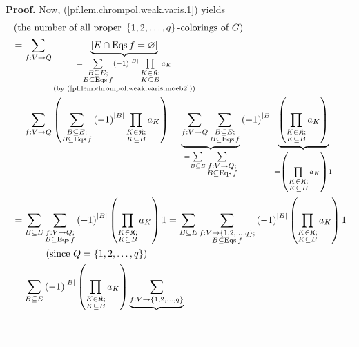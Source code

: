 \documentclass[numbers=enddot,12pt,final,onecolumn,notitlepage]{scrartcl}%
\theoremstyle{definition}
\newenvironment{proof}[1][Proof]{\noindent\textbf{#1.} }{\ \rule{0.5em}{0.5em}}
\newenvironment{verlong}{}{}
\let\sumnonlimits\sum
\let\prodnonlimits\prod
\renewcommand{\sum}{\sumnonlimits\limits}
\renewcommand{\prod}{\prodnonlimits\limits}
\begin{document}
\begin{verlong}
\begin{proof}
Now, (\ref{pf.lem.chrompol.weak.varis.1}) yields%
\begin{align*}
&  \left(  \text{the number of all proper }\left\{  1,2,\ldots,q\right\}
\text{-colorings of }G\right) \\
&  =\sum_{f:V\rightarrow Q}\underbrace{\left[  E\cap\operatorname*{Eqs}%
f=\varnothing\right]  }_{\substack{=\sum_{\substack{B\subseteq E;\\B\subseteq
\operatorname*{Eqs}f}}\left(  -1\right)  ^{\left\vert B\right\vert }%
\prod_{\substack{K\in\mathfrak{K};\\K\subseteq B}}a_{K}\\\text{(by
(\ref{pf.lem.chrompol.weak.varis.moeb2}))}}}\\
&  =\sum_{f:V\rightarrow Q}\left(  \sum_{\substack{B\subseteq E;\\B\subseteq
\operatorname*{Eqs}f}}\left(  -1\right)  ^{\left\vert B\right\vert }%
\prod_{\substack{K\in\mathfrak{K};\\K\subseteq B}}a_{K}\right)
=\underbrace{\sum_{f:V\rightarrow Q}\sum_{\substack{B\subseteq E;\\B\subseteq
\operatorname*{Eqs}f}}}_{=\sum_{B\subseteq E}\sum_{\substack{f:V\rightarrow
Q;\\B\subseteq\operatorname*{Eqs}f}}}\left(  -1\right)  ^{\left\vert
B\right\vert }\underbrace{\left(  \prod_{\substack{K\in\mathfrak{K}%
;\\K\subseteq B}}a_{K}\right)  }_{=\left(  \prod_{\substack{K\in
\mathfrak{K};\\K\subseteq B}}a_{K}\right)  1}\\
&  =\sum_{B\subseteq E}\sum_{\substack{f:V\rightarrow Q;\\B\subseteq
\operatorname*{Eqs}f}}\left(  -1\right)  ^{\left\vert B\right\vert }\left(
\prod_{\substack{K\in\mathfrak{K};\\K\subseteq B}}a_{K}\right)  1=\sum
_{B\subseteq E}\sum_{\substack{f:V\rightarrow\left\{  1,2,\ldots,q\right\}
;\\B\subseteq\operatorname*{Eqs}f}}\left(  -1\right)  ^{\left\vert
B\right\vert }\left(  \prod_{\substack{K\in\mathfrak{K};\\K\subseteq B}%
}a_{K}\right)  1\\
&  \ \ \ \ \ \ \ \ \ \ \left(  \text{since }Q=\left\{  1,2,\ldots,q\right\}
\right) \\
&  =\sum_{B\subseteq E}\left(  -1\right)  ^{\left\vert B\right\vert }\left(
\prod_{\substack{K\in\mathfrak{K};\\K\subseteq B}}a_{K}\right)
\underbrace{\sum_{\substack{f:V\rightarrow\left\{  1,2,\ldots,q\right\}
}}}
\end{align*}
\end{proof}
\end{verlong}
\end{document}
